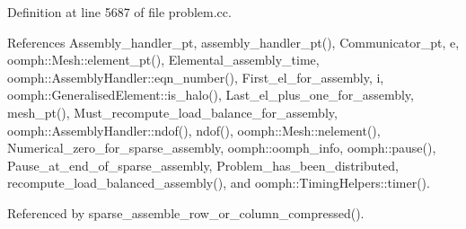 Definition at line 5687 of file problem.\+cc.



References Assembly\+\_\+handler\+\_\+pt, assembly\+\_\+handler\+\_\+pt(), Communicator\+\_\+pt, e, oomph\+::\+Mesh\+::element\+\_\+pt(), Elemental\+\_\+assembly\+\_\+time, oomph\+::\+Assembly\+Handler\+::eqn\+\_\+number(), First\+\_\+el\+\_\+for\+\_\+assembly, i, oomph\+::\+Generalised\+Element\+::is\+\_\+halo(), Last\+\_\+el\+\_\+plus\+\_\+one\+\_\+for\+\_\+assembly, mesh\+\_\+pt(), Must\+\_\+recompute\+\_\+load\+\_\+balance\+\_\+for\+\_\+assembly, oomph\+::\+Assembly\+Handler\+::ndof(), ndof(), oomph\+::\+Mesh\+::nelement(), Numerical\+\_\+zero\+\_\+for\+\_\+sparse\+\_\+assembly, oomph\+::oomph\+\_\+info, oomph\+::pause(), Pause\+\_\+at\+\_\+end\+\_\+of\+\_\+sparse\+\_\+assembly, Problem\+\_\+has\+\_\+been\+\_\+distributed, recompute\+\_\+load\+\_\+balanced\+\_\+assembly(), and oomph\+::\+Timing\+Helpers\+::timer().



Referenced by sparse\+\_\+assemble\+\_\+row\+\_\+or\+\_\+column\+\_\+compressed().

\mbox{\label{classoomph_1_1Problem_a3d5d5ac657381a2b2b077988e887fef8}} 
